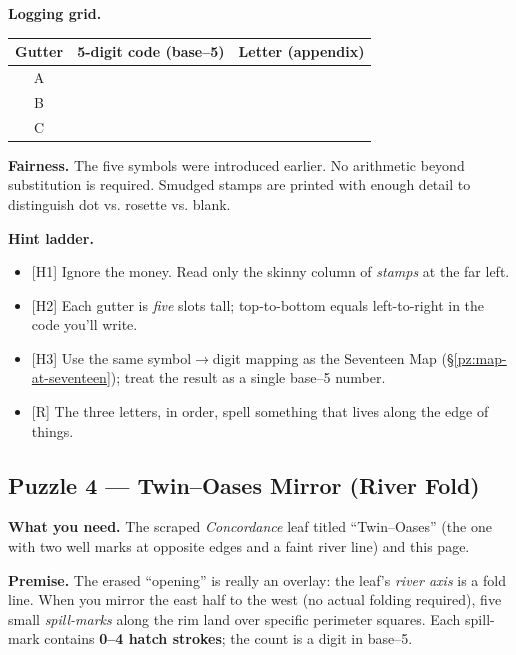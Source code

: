 \documentclass[11pt]{article}
\begin{document}
\begin{itemize}
\medskip
\noindent\textbf{Logging grid.}
\begin{center}
\begin{tabular}{c|c|c}
\textbf{Gutter} & \textbf{5-digit code (base–5)} & \textbf{Letter (appendix)} \\
\hline
A & \hspace{3.5cm} & \hspace{1.2cm} \\
B & \hspace{3.5cm} & \hspace{1.2cm} \\
C & \hspace{3.5cm} & \hspace{1.2cm} \\
\end{tabular}
\end{center}

\medskip
\noindent\textbf{Fairness.} The five symbols were introduced earlier. No arithmetic beyond substitution is required. Smudged stamps are printed with enough detail to distinguish dot vs. rosette vs. blank.

\medskip
\noindent\textbf{Hint ladder.}
\begin{itemize}\setlength\itemsep{0.25em}
  \item \textsc{[H1]} Ignore the money. Read only the skinny column of \emph{stamps} at the far left.
  \item \textsc{[H2]} Each gutter is \emph{five} slots tall; top-to-bottom equals left-to-right in the code you’ll write.
  \item \textsc{[H3]} Use the same symbol\(\rightarrow\)digit mapping as the Seventeen Map (\S\ref{pz:map-at-seventeen}); treat the result as a single base–5 number.
  \item \textsc{[R]} The three letters, in order, spell something that lives along the edge of things.
\end{itemize}

\subsection{Puzzle 4 — Twin–Oases Mirror (River Fold)}
\label{pz:twin-oases}

\noindent\textbf{What you need.} The scraped \emph{Concordance} leaf titled “Twin–Oases” (the one with two well marks at opposite edges and a faint river line) and this page.

\medskip
\noindent\textbf{Premise.} The erased “opening” is really an overlay: the leaf’s \emph{river axis} is a fold line. When you mirror the east half to the west (no actual folding required), five small \emph{spill-marks} along the rim land over specific perimeter squares. Each spill-mark contains \textbf{0–4 hatch strokes}; the count is a digit in base–5.


\end{itemize}
\end{document}
